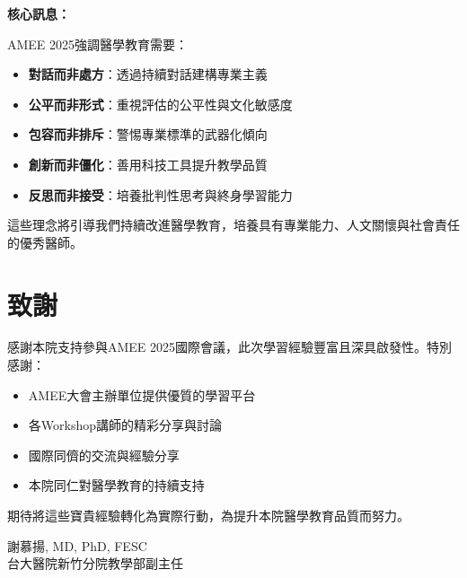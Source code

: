 \documentclass[12pt,a4paper]{article}
\newcommand{\mydate}{\DTMtoday}
\begin{document}

\begin{importantbox}
\textbf{核心訊息：}

AMEE 2025強調醫學教育需要：
\begin{itemize}[nosep]
    \item \textbf{對話而非處方}：透過持續對話建構專業主義
    \item \textbf{公平而非形式}：重視評估的公平性與文化敏感度
    \item \textbf{包容而非排斥}：警惕專業標準的武器化傾向
    \item \textbf{創新而非僵化}：善用科技工具提升教學品質
    \item \textbf{反思而非接受}：培養批判性思考與終身學習能力
\end{itemize}

這些理念將引導我們持續改進醫學教育，培養具有專業能力、人文關懷與社會責任的優秀醫師。
\end{importantbox}

\section{致謝}

感謝本院支持參與AMEE 2025國際會議，此次學習經驗豐富且深具啟發性。特別感謝：
\begin{itemize}[nosep]
    \item AMEE大會主辦單位提供優質的學習平台
    \item 各Workshop講師的精彩分享與討論
    \item 國際同儕的交流與經驗分享
    \item 本院同仁對醫學教育的持續支持
\end{itemize}

期待將這些寶貴經驗轉化為實際行動，為提升本院醫學教育品質而努力。

\vspace{1cm}
\begin{flushright}
謝慕揚, MD, PhD, FESC\\
台大醫院新竹分院教學部副主任\\
\mydate
\end{flushright}
\end{document}
